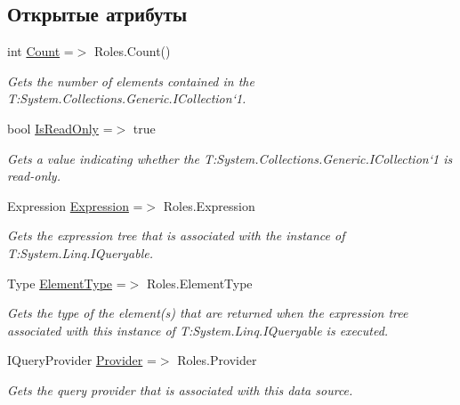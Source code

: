 \subsection*{Открытые атрибуты}
\begin{DoxyCompactItemize}
\item 
int \hyperlink{class_security_1_1_entity_framework_1_1_collections_1_1_role_collection_ad23c5d098140ae4eab4de4fb35821128}{Count} =$>$ Roles.\+Count()
\begin{DoxyCompactList}\small\item\em Gets the number of elements contained in the T\+:\+System.\+Collections.\+Generic.\+I\+Collection`1. \end{DoxyCompactList}\item 
bool \hyperlink{class_security_1_1_entity_framework_1_1_collections_1_1_role_collection_aa8d1b46f3b573ec7151361cb03c16540}{Is\+Read\+Only} =$>$ true
\begin{DoxyCompactList}\small\item\em Gets a value indicating whether the T\+:\+System.\+Collections.\+Generic.\+I\+Collection`1 is read-\/only. \end{DoxyCompactList}\item 
Expression \hyperlink{class_security_1_1_entity_framework_1_1_collections_1_1_role_collection_ad3e4a6effbcaa065d3f0c77cb9f5543d}{Expression} =$>$ Roles.\+Expression
\begin{DoxyCompactList}\small\item\em Gets the expression tree that is associated with the instance of T\+:\+System.\+Linq.\+I\+Queryable. \end{DoxyCompactList}\item 
Type \hyperlink{class_security_1_1_entity_framework_1_1_collections_1_1_role_collection_a1b6965e83d7f6a0c5477368f3695c511}{Element\+Type} =$>$ Roles.\+Element\+Type
\begin{DoxyCompactList}\small\item\em Gets the type of the element(s) that are returned when the expression tree associated with this instance of T\+:\+System.\+Linq.\+I\+Queryable is executed. \end{DoxyCompactList}\item 
I\+Query\+Provider \hyperlink{class_security_1_1_entity_framework_1_1_collections_1_1_role_collection_a0eaa9ba565c760aa89b8c5cfe9482c73}{Provider} =$>$ Roles.\+Provider
\begin{DoxyCompactList}\small\item\em Gets the query provider that is associated with this data source. \end{DoxyCompactList}\end{DoxyCompactItemize}
